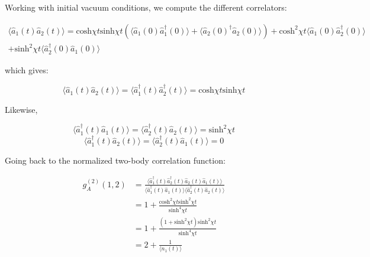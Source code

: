 \noindent Working with initial vacuum conditions, we compute the different correlators:

\begin{equation}
\begin{split}
   \langle \hat{a}_1(t) \hat{a}_2(t) \rangle = \mathrm{cosh} \chi t \mathrm{sinh} \chi t (\langle \hat{a}_1(0) \hat{a}_1^{\dagger}(0) \rangle+ \langle \hat{a}_2(0)^{\dagger} \hat{a}_2(0) \rangle) + \mathrm{cosh}^2 \chi t \langle \hat{a}_1(0) \hat{a}_2^{\dagger}(0) \rangle \\
   + \mathrm{sinh}^2 \chi t \langle \hat{a}_2^{\dagger}(0) \hat{a}_1(0) \rangle 
\end{split}
\end{equation}

\noindent which gives:

\begin{equation}
    \langle \hat{a}_1(t) \hat{a}_2(t) \rangle = \langle \hat{a}_1^{\dagger}(t) \hat{a}_2^{\dagger}(t) \rangle = \mathrm{cosh} \chi t \mathrm{sinh} \chi t
\end{equation}

\noindent Likewise,

\begin{equation}
     \langle \hat{a}_1^{\dagger}(t) \hat{a}_1(t) \rangle = \langle \hat{a}_2^{\dagger}(t) \hat{a}_2(t) \rangle = \mathrm{sinh}^2 \chi t
\end{equation}
\begin{equation}
    \langle \hat{a}_1^{\dagger}(t) \hat{a}_2(t) \rangle =  \langle \hat{a}_2^{\dagger}(t) \hat{a}_1(t) \rangle = 0
\end{equation}

\noindent Going back to the normalized two-body correlation function:

\begin{equation}
\begin{aligned}
      g^{(2)}_A(1,2) & = \frac{\langle \hat{a}_1^{\dagger}(t) \hat{a}_2^{\dagger}(t) \hat{a}_2(t) \hat{a}_1(t) \rangle}{\langle \hat{a}_1^{\dagger}(t) \hat{a}_1(t) \rangle \langle \hat{a}_2^{\dagger}(t) \hat{a}_2(t) \rangle} \\
      & = 1 + \frac{\mathrm{cosh}^2 \chi t \mathrm{sinh}^2 \chi t}{\mathrm{sinh}^4 \chi t} \\
      & = 1+\frac{(1+\mathrm{sinh}^2 \chi t)\mathrm{sinh}^2 \chi t}{\mathrm{sinh}^4 \chi t} \\
      & = 2 + \frac{1}{\langle n_1(t) \rangle} 
      \label{eq:amp_g2_A}
\end{aligned}
\end{equation}

